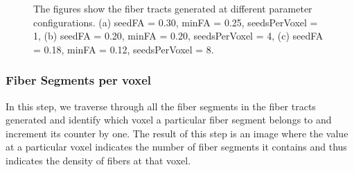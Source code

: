 \documentclass{llncs}
\begin{document}
\begin{figure}
    \centering
    \caption{The figures show the fiber tracts generated at different parameter configurations. (a) seedFA = 0.30, minFA = 0.25, seedsPerVoxel = 1, (b) seedFA = 0.20, minFA = 0.20, seedsPerVoxel = 4, (c) seedFA = 0.18, minFA = 0.12, seedsPerVoxel = 8.}
    \label{fig:parameterConfig}
\end{figure}

%
\subsubsection{Fiber Segments per voxel}
%
In this step, we traverse through all the fiber segments in the fiber tracts generated and identify which voxel a particular fiber segment belongs to and increment its counter by one.  The result of this step is an image where the value at a particular voxel indicates the number of fiber segments it contains and thus indicates the density of fibers at that voxel.
\end{document}
